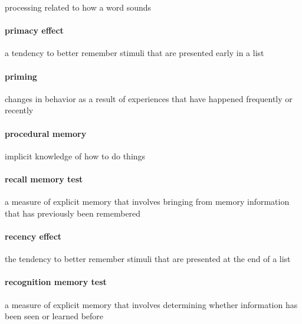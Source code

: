 \documentclass[
]{krantz}
\begin{document}
processing related to how a word sounds

\paragraph*{primacy effect}\label{primacy-effect}

a tendency to better remember stimuli that are presented early in a list

\paragraph*{priming}\label{priming}

changes in behavior as a result of experiences that have happened frequently or recently

\paragraph*{procedural memory}\label{procedural-memory}

implicit knowledge of how to do things

\paragraph*{recall memory test}\label{recall-memory-test}

a measure of explicit memory that involves bringing from memory information that has previously been remembered

\paragraph*{recency effect}\label{recency-effect}

the tendency to better remember stimuli that are presented at the end of a list

\paragraph*{recognition memory test}\label{recognition-memory-test}

a measure of explicit memory that involves determining whether information has been seen or learned before
\end{document}
